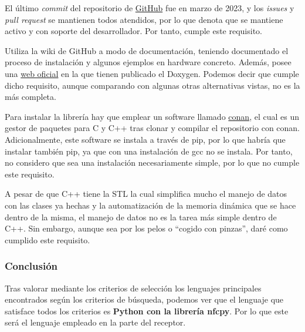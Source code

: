\begin{todolist}
    \item [\xcmark] El último \emph{commit} del repositorio de
    \href{https://github.com/liblogicalaccess/liblogicalaccess}{GitHub} fue en
    marzo de 2023, y los \emph{issues} y \emph{pull request} se mantienen todos
    atendidos, por lo que denota que se mantiene activo y con soporte del
    desarrollador. Por tanto, cumple este requisito.
    \item [\xcmark] Utiliza la wiki de GitHub a modo de documentación, teniendo
    documentado el proceso de instalación y algunos ejemplos en hardware
    concreto. Además, posee una \href{https://liblogicalaccess.com/}{web oficial}
    en la que tienen publicado el Doxygen. Podemos decir que cumple dicho requisito,
    aunque comparando con algunas otras alternativas vistas, no es la más
    completa.
    \item Para instalar la librería hay que emplear un software llamado
    \href{https://conan.io/}{conan}, el cual es un gestor de paquetes para C y
    C++ tras clonar y compilar el repositorio con conan. Adicionalmente, este
    software se instala a través de pip, por lo que habría que instalar también
    pip, ya que con una instalación de gcc no se instala. Por tanto, no considero
    que sea una instalación necesariamente simple, por lo que no cumple este
    requisito.
    \item [\xcmark] A pesar de que C++ tiene la STL la cual simplifica mucho el manejo de
    datos con las clases ya hechas y la automatización de la memoria dinámica
    que se hace dentro de la misma, el manejo de datos no es la tarea más simple
    dentro de C++. Sin embargo, aunque sea por los pelos o ``cogido con pinzas'',
    daré como cumplido este requisito.
\end{todolist}

\subsubsection{Conclusión}

Tras valorar mediante los criterios de selección los lenguajes principales
encontrados según los criterios de búsqueda, podemos ver que el lenguaje que
satisface todos los criterios es \textbf{Python con la librería nfcpy}. Por lo que este
será el lenguaje empleado en la parte del receptor.